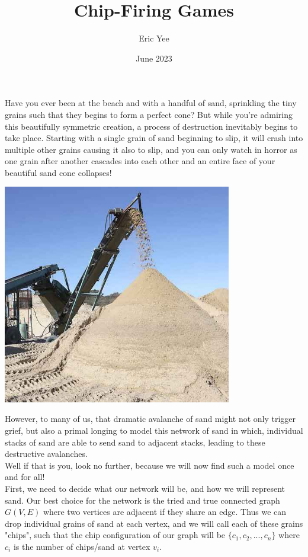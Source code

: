 \documentclass{article}
\title{Chip-Firing Games}
\author{Eric Yee}
\date{June 2023}
\begin{document}
\maketitle
Have you ever been at the beach and with a handful of sand, sprinkling the tiny grains such that they begins to form a perfect cone? But while you're admiring this beautifully symmetric creation, a process of destruction inevitably begins to take place. Starting with a single grain of sand beginning to slip, it will crash into multiple other grains causing it also to slip, and you can only watch in horror as one grain after another cascades into each other and an entire face of your beautiful sand cone collapses! \\

\begin{center}
    \includegraphics[width=10cm]{images/sand.jpg}
\end{center}

However, to many of us, that dramatic avalanche of sand might not only trigger grief, but also a primal longing to model this network of sand in which, individual stacks of sand are able to send sand to adjacent stacks, leading to these destructive avalanches.\\

Well if that is you, look no further, because we will now find such a model once and for all!\\

First, we need to decide what our network will be, and how we will represent sand. Our best choice for the network is the tried and true connected graph $G(V,E)$ where two vertices are adjacent if they share an edge. Thus we can drop individual grains of sand at each vertex, and we will call each of these grains "chips", such that the chip configuration of our graph will be $\{c_1,c_2,...,c_n\}$ where $c_i$ is the number of chips/sand at vertex $v_i$.\\
\end{document}

